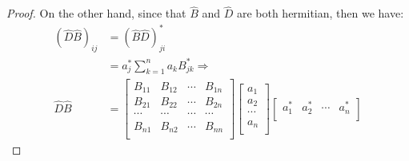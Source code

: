 \begin{proof}
On the other hand, since that $\hat{B}$ and $\hat{D}$ are both
hermitian, then we have:
\begin{equation}\label{}
\begin{split}
  (\hat{D}\hat{B})_{ij} &= (\hat{B}\hat{D})^{*}_{ji} \\
    &= a^{*}_{j}\sum_{k=1}^{n}a_{k}B^{*}_{jk} \Rightarrow \\
   \hat{D}\hat{B} &=
\begin{bmatrix}
     B_{11} & B_{12} & \cdots & B_{1n} \\
     B_{21} & B_{22} & \cdots & B_{2n} \\
     \cdots & \cdots & \cdots & \cdots \\
     B_{n1} & B_{n2} & \cdots & B_{nn} \\
   \end{bmatrix}
\begin{bmatrix}
a_{1} \\
a_{2} \\
\cdots   \\
a_{n} \\
\end{bmatrix}
\begin{bmatrix}
a_{1}^{*} & a_{2}^{*} & \cdots & a_{n}^{*} \\
\end{bmatrix}
\end{split}
\end{equation}
 \qedhere
\end{proof}

